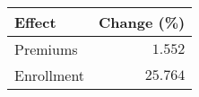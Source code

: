 \begin{longtable}{lr}
\toprule
Effect & Change (\%) \\ 
\midrule\addlinespace[2.5pt]
Premiums & $1.552$ \\ 
Enrollment & $25.764$ \\ 
\bottomrule
\end{longtable}

